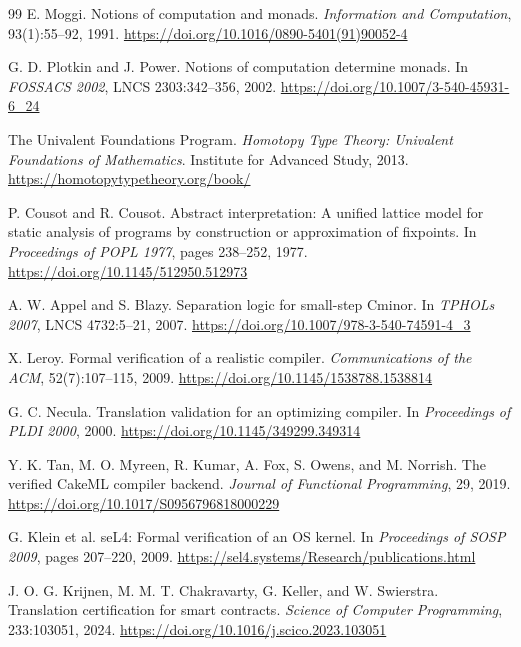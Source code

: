 \begin{thebibliography}{99}
E. Moggi.
\newblock Notions of computation and monads.
\newblock \emph{Information and Computation}, 93(1):55--92, 1991.
\newblock \url{https://doi.org/10.1016/0890-5401(91)90052-4}

G. D. Plotkin and J. Power.
\newblock Notions of computation determine monads.
\newblock In \emph{FOSSACS 2002}, LNCS 2303:342--356, 2002.
\newblock \url{https://doi.org/10.1007/3-540-45931-6_24}

The Univalent Foundations Program.
\newblock \emph{Homotopy Type Theory: Univalent Foundations of Mathematics}.
\newblock Institute for Advanced Study, 2013.
\newblock \url{https://homotopytypetheory.org/book/}

P. Cousot and R. Cousot.
\newblock Abstract interpretation: A unified lattice model for static analysis of
programs by construction or approximation of fixpoints.
\newblock In \emph{Proceedings of POPL 1977}, pages 238--252, 1977.
\newblock \url{https://doi.org/10.1145/512950.512973}

A. W. Appel and S. Blazy.
\newblock Separation logic for small-step Cminor.
\newblock In \emph{TPHOLs 2007}, LNCS 4732:5--21, 2007.
\newblock \url{https://doi.org/10.1007/978-3-540-74591-4_3}

X. Leroy.
\newblock Formal verification of a realistic compiler.
\newblock \emph{Communications of the ACM}, 52(7):107--115, 2009.
\newblock \url{https://doi.org/10.1145/1538788.1538814}

G. C. Necula.
\newblock Translation validation for an optimizing compiler.
\newblock In \emph{Proceedings of PLDI 2000}, 2000.
\newblock \url{https://doi.org/10.1145/349299.349314}

Y. K. Tan, M. O. Myreen, R. Kumar, A. Fox, S. Owens, and M. Norrish.
\newblock The verified CakeML compiler backend.
\newblock \emph{Journal of Functional Programming}, 29, 2019.
\newblock \url{https://doi.org/10.1017/S0956796818000229}

G. Klein et al.
\newblock seL4: Formal verification of an OS kernel.
\newblock In \emph{Proceedings of SOSP 2009}, pages 207--220, 2009.
\newblock \url{https://sel4.systems/Research/publications.html}

J. O. G. Krijnen, M. M. T. Chakravarty, G. Keller, and W. Swierstra.
\newblock Translation certification for smart contracts.
\newblock \emph{Science of Computer Programming}, 233:103051, 2024.
\newblock \url{https://doi.org/10.1016/j.scico.2023.103051}


\end{thebibliography}
